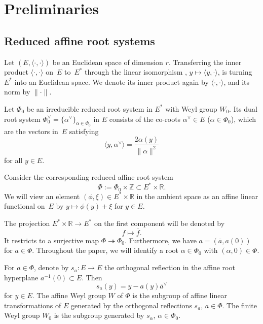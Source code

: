\section{Preliminaries}\label{prel}

\subsection{Reduced affine root systems}

Let $(E,\langle\cdot,\cdot\rangle)$ be an Euclidean space of dimension $r$. Transferring the inner product $\langle\cdot,\cdot\rangle$ on~$E$ to~$E^*$ through the linear isomorphism , $y\mapsto \langle y,\cdot\rangle$, is turning $E^*$ into an Euclidean space. We denote its inner product again by $\langle\cdot,\cdot\rangle$, and its norm by $\|\cdot\|$.

Let $\Phi_0$ be an irreducible reduced root system in $E^*$ with Weyl group $W_0$. Its dual root system $\Phi_0^\vee=\{\alpha^\vee\}_{\alpha\in\Phi_0}$ in $E$ consists of the co-roots $\alpha^\vee\in E$ ($\alpha\in\Phi_0$), which are the vectors in~$E$ satisfying
\begin{equation}\label{corootdef}
\bigl\langle y,\alpha^\vee\bigr\rangle=\frac{2\alpha(y)}{\|\alpha\|^2}
\end{equation}
for all $y\in E$.

Consider the corresponding reduced affine root system
\[
\Phi:=\Phi_0\times \mathbb{Z}\subset E^*\times\mathbb{R}.
\]
We will view an element $(\phi,\xi)\in E^*\times\mathbb{R}$ in the ambient space as an affine linear functional on~$E$ by $y\mapsto\phi(y)+\xi$ for $y\in E$.

The projection $E^*\times\mathbb{R}\rightarrow E^*$ on the first component will be denoted by
\[
f\mapsto\overline{f}.
\]
It restricts to a surjective map $\Phi\twoheadrightarrow\Phi_0$. Furthermore, we have $a=(\overline{a},a(0))$ for $a\in\Phi$.
Throughout the paper, we will identify a root $\alpha\in\Phi_0$ with $(\alpha,0)\in\Phi$.

For $a\in\Phi$, denote by $s_a\colon E\rightarrow E$ the orthogonal reflection in the affine root hyperplane $a^{-1}(0)\subset E$. Then
\begin{equation*}%
s_a(y)=y-a(y)\overline{a}^\vee
\end{equation*}
for $y\in E$.
The affine Weyl group $W$ of $\Phi$ is the subgroup of affine linear transformations of $E$ generated by the orthogonal reflections $s_a$, $a\in\Phi$. The finite Weyl group $W_0$ is the subgroup generated by $s_\alpha$, $\alpha\in\Phi_0$.

